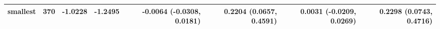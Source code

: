 \begin{tabular}{lrrrrrrr}
smallest & 370 & -1.0228 & -1.2495 & -0.0064 (-0.0308, 0.0181) & 0.2204 (0.0657, 0.4591) & 0.0031 (-0.0209, 0.0269) & 0.2298 (0.0743, 0.4716) \\
\bottomrule
\end{tabular}
